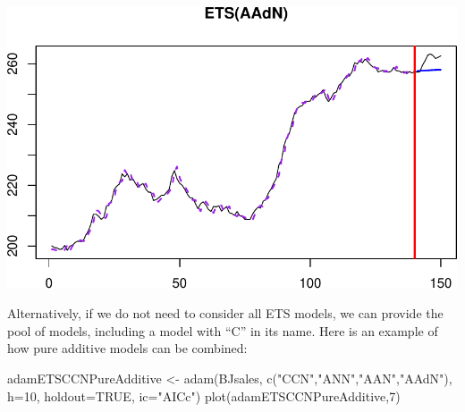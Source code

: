 \documentclass[
]{book}
\newenvironment{Shaded}{\begin{snugshade}}{\end{snugshade}}
\newcommand{\AttributeTok}[1]{\textcolor[rgb]{0.77,0.63,0.00}{#1}}
\newcommand{\ConstantTok}[1]{\textcolor[rgb]{0.00,0.00,0.00}{#1}}
\newcommand{\DecValTok}[1]{\textcolor[rgb]{0.00,0.00,0.81}{#1}}
\newcommand{\FunctionTok}[1]{\textcolor[rgb]{0.00,0.00,0.00}{#1}}
\newcommand{\NormalTok}[1]{#1}
\newcommand{\OtherTok}[1]{\textcolor[rgb]{0.56,0.35,0.01}{#1}}
\newcommand{\SpecialCharTok}[1]{\textcolor[rgb]{0.00,0.00,0.00}{#1}}
\newcommand{\StringTok}[1]{\textcolor[rgb]{0.31,0.60,0.02}{#1}}
\theoremstyle{definition}
\theoremstyle{definition}
\theoremstyle{definition}
\theoremstyle{definition}
\theoremstyle{remark}
\begin{document}
\begin{Shaded}
\end{Shaded}

\includegraphics{adam_files/figure-latex/unnamed-chunk-183-1.pdf}

Alternatively, if we do not need to consider all ETS models, we can provide the pool of models, including a model with ``C'' in its name. Here is an example of how pure additive models can be combined:

\begin{Shaded}
\begin{Highlighting}[]
\NormalTok{adamETSCCNPureAdditive }\OtherTok{\textless{}{-}} \FunctionTok{adam}\NormalTok{(BJsales, }
                               \FunctionTok{c}\NormalTok{(}\StringTok{"CCN"}\NormalTok{,}\StringTok{"ANN"}\NormalTok{,}\StringTok{"AAN"}\NormalTok{,}\StringTok{"AAdN"}\NormalTok{), }
                               \AttributeTok{h=}\DecValTok{10}\NormalTok{, }\AttributeTok{holdout=}\ConstantTok{TRUE}\NormalTok{,}
                               \AttributeTok{ic=}\StringTok{"AICc"}\NormalTok{)}
\FunctionTok{plot}\NormalTok{(adamETSCCNPureAdditive,}\DecValTok{7}\NormalTok{)}
\end{Highlighting}
\end{Shaded}
\end{document}
